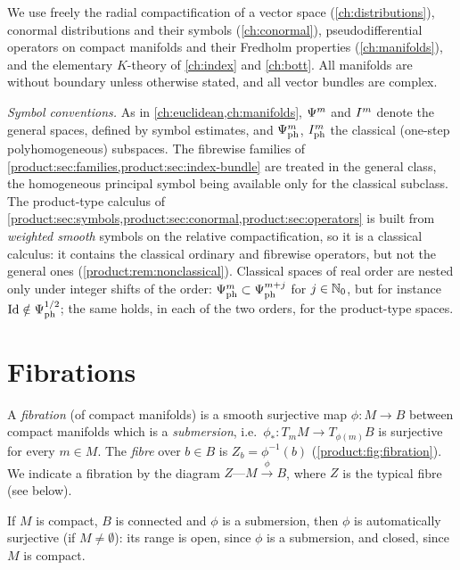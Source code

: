 We use freely the radial compactification of a vector space
(\cref{ch:distributions}), conormal distributions and their symbols
(\cref{ch:conormal}), pseudodifferential operators on compact manifolds and
their Fredholm properties (\cref{ch:manifolds}), and the elementary $K$-theory
of \cref{ch:index} and \cref{ch:bott}. All manifolds are without boundary unless
otherwise stated, and all vector bundles are complex.

\emph{Symbol conventions.} As in \cref{ch:euclidean,ch:manifolds}, $\Psi^{m}$ and
$I^{m}$ denote the general spaces, defined by symbol estimates, and
$\Psi^{m}_{\mathrm{ph}}$, $I^{m}_{\mathrm{ph}}$ the classical (one-step
polyhomogeneous) subspaces. The fibrewise families of
\cref{product:sec:families,product:sec:index-bundle} are treated in the general
class, the homogeneous principal symbol being available only for the classical
subclass. The product-type calculus of
\cref{product:sec:symbols,product:sec:conormal,product:sec:operators} is built from
\emph{weighted smooth} symbols on the relative compactification, so it is a
classical calculus: it contains the classical ordinary and fibrewise operators, but
not the general ones (\cref{product:rem:nonclassical}). Classical spaces of real
order are nested only under integer shifts of the order:
$\Psi^{m}_{\mathrm{ph}}\subset\Psi^{m+j}_{\mathrm{ph}}$ for $j\in\mathbb{N}_0$, but for
instance $\operatorname{Id}\notin\Psi^{1/2}_{\mathrm{ph}}$; the same holds, in each of the two
orders, for the product-type spaces.

\section{Fibrations}\label{product:sec:fibrations}

\begin{definition}\label{product:def:fibration}
A \emph{fibration} (of compact manifolds) is a smooth surjective map
$\phi:M\longrightarrow B$ between compact manifolds which is a
\emph{submersion}, i.e.\ $\phi_*:T_mM\longrightarrow T_{\phi(m)}B$ is surjective
for every $m\in M$. The \emph{fibre} over $b\in B$ is $Z_b=\phi^{-1}(b)$
(\cref{product:fig:fibration}). We
indicate a fibration by the diagram $Z\text{---}M\overset{\phi}{\longrightarrow}B$,
where $Z$ is the typical fibre (see below).
\end{definition}

If $M$ is compact, $B$ is connected and $\phi$ is a submersion, then $\phi$ is
automatically surjective (if $M\neq\emptyset$): its range is open, since $\phi$ is
a submersion, and closed, since $M$ is compact.

